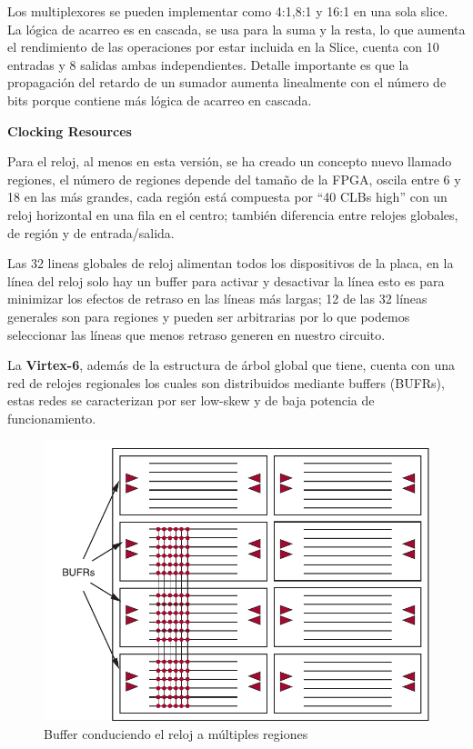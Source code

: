 \documentclass[11pt,a4paper]{article}
\begin{document}
Los multiplexores se pueden implementar como 4:1,8:1 y 16:1 en una sola slice.
La lógica de acarreo es en cascada, se usa para la suma y la resta, lo que aumenta el rendimiento de las operaciones por estar incluida en la Slice, cuenta con 10 entradas y 8 salidas ambas independientes. Detalle importante es que la propagación del retardo de un sumador aumenta linealmente con el número de bits porque contiene más lógica de acarreo en cascada.

{\Large \textbf{Clocking Resources}}

Para el reloj, al menos en esta versión, se ha creado un concepto nuevo llamado regiones, el número de regiones depende del tamaño de la FPGA, oscila entre 6 y 18 en las más grandes, cada región está compuesta por ``40 CLBs high'' con un reloj horizontal en una fila en el centro; también diferencia entre relojes globales, de región y de entrada/salida.

Las 32 lineas globales de reloj alimentan todos los dispositivos de la placa, en la línea del reloj solo hay un buffer para activar y desactivar la línea esto es para minimizar los efectos de retraso en las líneas más largas; 12 de las 32 líneas generales son para regiones y pueden ser arbitrarias por lo que podemos seleccionar las líneas que menos retraso generen en nuestro circuito.

La \textbf{Virtex-6}, además de la estructura de árbol global que tiene, cuenta con una red de relojes regionales los cuales son distribuidos mediante buffers (BUFRs), estas redes se caracterizan por ser low-skew y de baja potencia de funcionamiento.

\begin{figure}[H]
    \centering
    \includegraphics[scale=0.6]{images/region_net_clock.pdf}
    \caption{Buffer conduciendo el reloj a múltiples regiones}
    \label{fig:buffer}
\end{figure}
\end{document}
